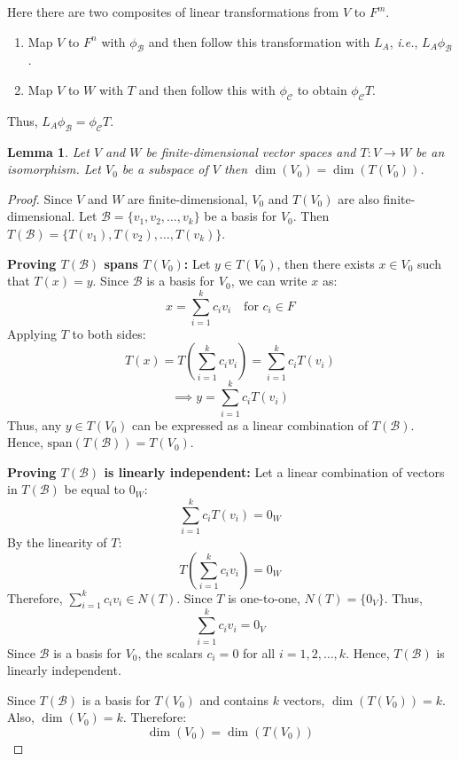 \documentclass[12pt, a4paper]{article}
\newtheorem{lemma}{Lemma}[section]
\theoremstyle{definition}
\theoremstyle{remark}
\newcommand{\B}{\mathscr{B}}
\begin{document}
\begin{figure}[h]
    \centering
\end{figure}

Here there are two composites of linear transformations from $V$ to $F^m$.
\begin{enumerate}
    \item Map $V$ to $F^n$ with $\phi_\B$ and then follow this transformation with $L_A$, \textit{i.e.}, $L_A\phi_\B$.

    \item Map $V$ to $W$ with $T$ and then follow this with $\phi_\mathscr{C}$ to obtain $\phi_\mathscr{C}T$.
   
\end{enumerate}
Thus, $L_A\phi_\B = \phi_\mathscr{C}T$.

\begin{lemma}
    Let $V$ and $W$ be finite-dimensional vector spaces and $T:V \to W$ be an isomorphism. Let $V_0$ be a subspace of $V$ then $\dim(V_0) = \dim(T(V_0))$.
\end{lemma}

\begin{proof}
    Since $V$ and $W$ are finite-dimensional, $V_0$ and $T(V_0)$ are also finite-dimensional. Let $\B = \{v_1, v_2, \dots, v_k\}$ be a basis for $V_0$. Then $T(\B) = \{T(v_1), T(v_2), \dots, T(v_k)\}$.

\textbf{Proving $T(\B)$ spans $T(V_0)$:}
Let $y \in T(V_0)$, then there exists $x \in V_0$ such that $T(x) = y$. Since $\B$ is a basis for $V_0$, we can write $x$ as:
\[ x = \sum_{i=1}^{k} c_i v_i \quad \text{for } c_i \in F \]
Applying $T$ to both sides:
\[ T(x) = T\left(\sum_{i=1}^{k} c_i v_i\right) = \sum_{i=1}^{k} c_i T(v_i) \]
\[ \implies y = \sum_{i=1}^{k} c_i T(v_i) \]
Thus, any $y \in T(V_0)$ can be expressed as a linear combination of $T(\B)$. Hence, $\text{span}(T(\B)) = T(V_0)$.

\textbf{Proving $T(\B)$ is linearly independent:}
Let a linear combination of vectors in $T(\B)$ be equal to $0_W$:
\[ \sum_{i=1}^{k} c_i T(v_i) = 0_W \]
By the linearity of $T$:
\[ T\left(\sum_{i=1}^{k} c_i v_i\right) = 0_W \]
Therefore, $\displaystyle\sum_{i=1}^{k} c_i v_i \in N(T)$. Since $T$ is one-to-one, $N(T) = \{0_V\}$. Thus,
\[ \sum_{i=1}^{k} c_i v_i = 0_V \]
Since $\B$ is a basis for $V_0$, the scalars $c_i = 0$ for all $i = 1, 2, \dots, k$. Hence, $T(\B)$ is linearly independent.

Since $T(\B)$ is a basis for $T(V_0)$ and contains $k$ vectors, $\dim(T(V_0)) = k$. Also, $\dim(V_0) = k$. Therefore:
\[ \dim(V_0) = \dim(T(V_0)) \]
\end{proof}
\end{document}
